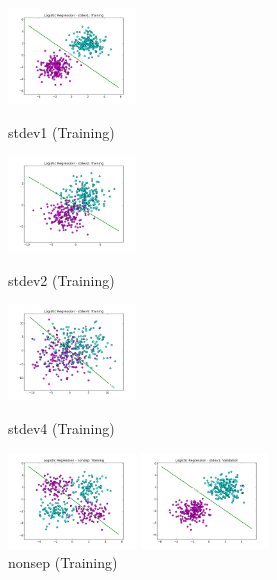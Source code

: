 \documentclass[10pt]{article}
\begin{document}
\begin{figure}[ht]
	\centering
	\begin{minipage}[b]{.24\linewidth}
		\includegraphics[width=1\linewidth, height=1in]{LR_stdev1_train.png}
		\caption*{stdev1 (Training)}
	\end{minipage}
	\begin{minipage}[b]{.24\linewidth}
		\includegraphics[width=1\linewidth, height=1in]{LR_stdev2_train.png}
		\caption*{stdev2 (Training)}
	\end{minipage}
	\begin{minipage}[b]{.24\linewidth}
		\includegraphics[width=1\linewidth, height=1in]{LR_stdev4_train.png}
		\caption*{stdev4 (Training)}
	\end{minipage}
	\begin{minipage}[b]{.24\linewidth}
		\includegraphics[width=1\linewidth, height=1in]{LR_nonsep_train.png}
		\caption*{nonsep (Training)}
	\end{minipage}
		\begin{minipage}[b]{.24\linewidth}
		\includegraphics[width=1\linewidth, height=1in]{LR_stdev1_validation.png}

\end{minipage}
\end{figure}
\end{document}
